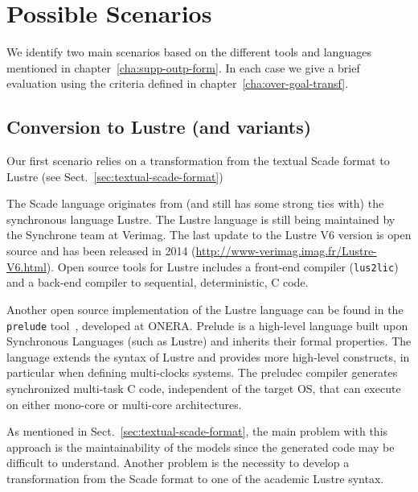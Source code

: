\documentclass{template/openetcs_report}
\begin{document}

\chapter{Possible Scenarios}
\label{cha:possible-scenarios}

We identify two main scenarios based on the different tools and
languages mentioned in chapter~\ref{cha:supp-outp-form}. In each case
we give a brief evaluation using the criteria defined in
chapter~\ref{cha:over-goal-transf}.

\section{Conversion to Lustre (and variants)}

Our first scenario relies on a transformation from the textual Scade
format to Lustre (see Sect.~\ref{sec:textual-scade-format})

The Scade language originates from (and still has some strong ties
with) the synchronous language Lustre. The Lustre language is still
being maintained by the Synchrone team at Verimag. The last update to
the Lustre V6 version is open source and has been released in 2014
(\url{http://www-verimag.imag.fr/Lustre-V6.html}). Open source tools
for Lustre includes a front-end compiler (\verb+lus2lic+) and a
back-end compiler to sequential, deterministic, C code.

Another open source implementation of the Lustre language can be found
in the \verb+prelude+ tool~\cite{forget:hal-00688490}, developed at
ONERA. Prelude is a high-level language built upon Synchronous
Languages (such as Lustre) and inherits their formal properties. The
language extends the syntax of Lustre and provides more high-level
constructs, in particular when defining multi-clocks systems. The
preludec compiler generates synchronized multi-task C code,
independent of the target OS, that can execute on either mono-core or
multi-core architectures.

As mentioned in Sect.~\ref{sec:textual-scade-format}, the main problem
with this approach is the maintainability of the models since the
generated code may be difficult to understand. Another problem is the
necessity to develop a transformation from the Scade format to one of
the academic Lustre syntax.
\end{document}
